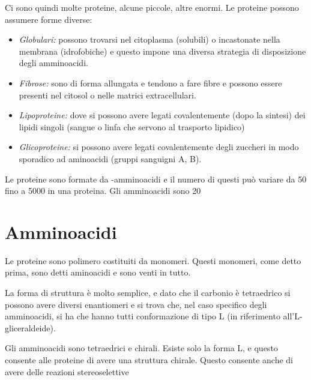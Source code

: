 Ci sono quindi molte proteine, alcune piccole, altre enormi. Le proteine possono assumere forme diverse:
\begin{itemize}
\item
\emph{Globulari:} possono trovarsi nel citoplasma
(solubili) o incastonate nella membrana (idrofobiche) e questo impone
una diversa strategia di disposizione degli amminoacidi.
\item
\emph{Fibrose:} sono di forma allungata e tendono a fare fibre e possono
essere presenti nel citosol o nelle matrici extracellulari.
\item
\emph{Lipoproteine:} dove si possono avere legati covalentemente (dopo la
sintesi) dei lipidi singoli (sangue o linfa che servono al trasporto
lipidico)
\item
\emph{Glicoproteine:} si possono avere legati covalentemente degli zuccheri
in modo sporadico ad aminoacidi (gruppi sanguigni A, B).
\end{itemize}

Le proteine sono formate da \alpha-amminoacidi e il numero di questi può
variare da 50 fino a 5000 in una proteina. Gli amminoacidi sono 20


\section{Amminoacidi}


Le proteine sono polimero costituiti da monomeri. Questi monomeri, come
detto prima, sono detti aminoacidi e sono venti in tutto.

La forma di struttura è molto semplice, e dato che il carbonio è
tetraedrico si possono avere diversi enantiomeri e si trova che, nel
caso specifico degli amminoacidi, si ha che hanno tutti conformazione di
tipo L (in riferimento all'L-gliceraldeide).

Gli amminoacidi sono tetraedrici e chirali. Esiste solo la forma L, e questo
consente alle proteine di avere una struttura chirale. Questo consente
anche di avere delle reazioni stereoselettive


